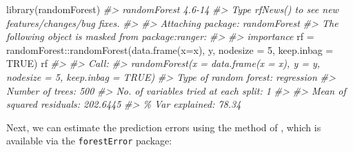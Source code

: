 \documentclass[
  graybox,natbib,nospthms]{svmono}
\newenvironment{Shaded}{\begin{snugshade}}{\end{snugshade}}
\newcommand{\AttributeTok}[1]{\textcolor[rgb]{0.61,0.61,0.61}{#1}}
\newcommand{\CommentTok}[1]{\textcolor[rgb]{0.37,0.37,0.37}{\textit{#1}}}
\newcommand{\ConstantTok}[1]{\textcolor[rgb]{0,0,0}{#1}}
\newcommand{\DecValTok}[1]{\textcolor[rgb]{0.06,0.06,0.06}{#1}}
\newcommand{\FunctionTok}[1]{\textcolor[rgb]{0,0,0}{#1}}
\newcommand{\NormalTok}[1]{#1}
\newcommand{\OtherTok}[1]{\textcolor[rgb]{0.37,0.37,0.37}{#1}}
\newcommand{\SpecialCharTok}[1]{\textcolor[rgb]{0,0,0}{#1}}
\begin{document}
\begin{Shaded}
\begin{Highlighting}[]
\FunctionTok{library}\NormalTok{(randomForest)}
\CommentTok{\#\textgreater{} randomForest 4.6{-}14}
\CommentTok{\#\textgreater{} Type rfNews() to see new features/changes/bug fixes.}
\CommentTok{\#\textgreater{} }
\CommentTok{\#\textgreater{} Attaching package: \textquotesingle{}randomForest\textquotesingle{}}
\CommentTok{\#\textgreater{} The following object is masked from \textquotesingle{}package:ranger\textquotesingle{}:}
\CommentTok{\#\textgreater{} }
\CommentTok{\#\textgreater{}     importance}
\NormalTok{rf }\OtherTok{=}\NormalTok{ randomForest}\SpecialCharTok{::}\FunctionTok{randomForest}\NormalTok{(}\FunctionTok{data.frame}\NormalTok{(}\AttributeTok{x=}\NormalTok{x), y, }\AttributeTok{nodesize =} \DecValTok{5}\NormalTok{, }\AttributeTok{keep.inbag =} \ConstantTok{TRUE}\NormalTok{)}
\NormalTok{rf}
\CommentTok{\#\textgreater{} }
\CommentTok{\#\textgreater{} Call:}
\CommentTok{\#\textgreater{}  randomForest(x = data.frame(x = x), y = y, nodesize = 5, keep.inbag = TRUE) }
\CommentTok{\#\textgreater{}                Type of random forest: regression}
\CommentTok{\#\textgreater{}                      Number of trees: 500}
\CommentTok{\#\textgreater{} No. of variables tried at each split: 1}
\CommentTok{\#\textgreater{} }
\CommentTok{\#\textgreater{}           Mean of squared residuals: 202.6445}
\CommentTok{\#\textgreater{}                     \% Var explained: 78.34}
\end{Highlighting}
\end{Shaded}

Next, we can estimate the prediction errors using the method of \citet{lu2021unified},
which is available via the \texttt{forestError} package:
\end{document}
